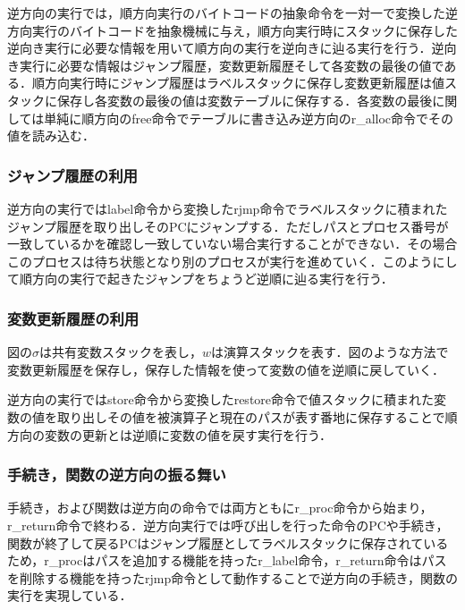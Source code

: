 \documentclass[submit,PRO]{ipsj}
\begin{document}
逆方向の実行では，順方向実行のバイトコードの抽象命令を一対一で変換した逆方向実行のバイトコードを抽象機械に与え，順方向実行時にスタックに保存した逆向き実行に必要な情報を用いて順方向の実行を逆向きに辿る実行を行う．逆向き実行に必要な情報はジャンプ履歴，変数更新履歴そして各変数の最後の値である．順方向実行時にジャンプ履歴はラベルスタックに保存し変数更新履歴は値スタックに保存し各変数の最後の値は変数テーブルに保存する．各変数の最後に関しては単純に順方向のfree命令でテーブルに書き込み逆方向のr\_alloc命令でその値を読み込む．


\subsubsection{ジャンプ履歴の利用}


逆方向の実行ではlabel命令から変換したrjmp命令でラベルスタックに積まれたジャンプ履歴を取り出しそのPCにジャンプする．ただしパスとプロセス番号が一致しているかを確認し一致していない場合実行することができない．その場合このプロセスは待ち状態となり別のプロセスが実行を進めていく．このようにして順方向の実行で起きたジャンプをちょうど逆順に辿る実行を行う．

\subsubsection{変数更新履歴の利用}

図の$\sigma$は共有変数スタックを表し，$w$は演算スタックを表す．図のような方法で変数更新履歴を保存し，保存した情報を使って変数の値を逆順に戻していく．

逆方向の実行ではstore命令から変換したrestore命令で値スタックに積まれた変数の値を取り出しその値を被演算子と現在のパスが表す番地に保存することで順方向の変数の更新とは逆順に変数の値を戻す実行を行う．

\subsubsection{手続き，関数の逆方向の振る舞い}

手続き，および関数は逆方向の命令では両方ともにr\_proc命令から始まり，r\_return命令で終わる．逆方向実行では呼び出しを行った命令のPCや手続き，関数が終了して戻るPCはジャンプ履歴としてラベルスタックに保存されているため，r\_procはパスを追加する機能を持ったr\_label命令，r\_return命令はパスを削除する機能を持ったrjmp命令として動作することで逆方向の手続き，関数の実行を実現している．
\end{document}
